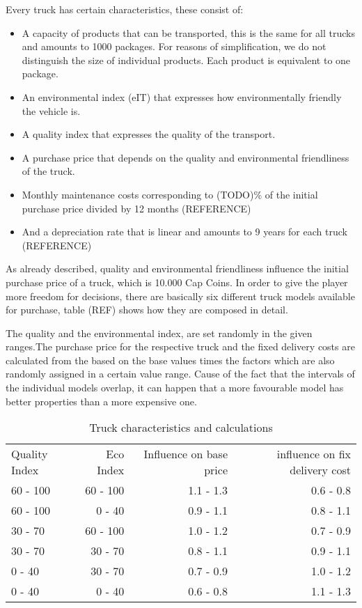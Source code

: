 Every truck has certain characteristics, these consist of:
\begin{itemize}
    \item A capacity of products that can be transported, this is the same for all trucks and amounts to 1000 packages. For reasons of simplification, we do not distinguish the size of individual products.  Each product is equivalent to one package. 
    \item An environmental index (eIT) that expresses how environmentally friendly the vehicle is.
    \item A quality index that expresses the quality of the transport.
    \item A purchase price that depends on the quality and environmental friendliness of the truck.
    \item Monthly maintenance costs corresponding to (TODO)\% of the initial purchase price divided by 12 months (REFERENCE)
    \item And a depreciation rate that is linear and amounts to 9 years for each truck (REFERENCE) 
\end{itemize}

As already described, quality and environmental friendliness influence the initial purchase price of a truck, which is 10.000 Cap Coins. In order to give the player more freedom for decisions, there are basically six different truck models available for purchase, table (REF) shows how they are composed in detail. 

The quality and the environmental index, are set randomly in the given ranges.The purchase price for the respective truck and the fixed delivery costs are calculated from the based on the base values times the factors which are also randomly assigned in a certain value range. Cause of the fact that the intervals of the individual models overlap, it can happen that a more favourable model has better properties than a more expensive one.


\begin{table}[ht]
    \centering
    \begin{tabular}{|l|r|r|r|}
    \hline
    Quality Index & Eco Index & Influence on base price & influence on fix delivery cost \\
    60 - 100      & 60 - 100   & 1.1 - 1.3   & 0.6 - 0.8       \\
    60 - 100      & 0 - 40     & 0.9 - 1.1   & 0.8 - 1.1       \\
    30 - 70       & 60 - 100   & 1.0 - 1.2   & 0.7 - 0.9       \\
    30 - 70       & 30 - 70    & 0.8 - 1.1   & 0.9 - 1.1       \\
    0 - 40        & 30 - 70    & 0.7 - 0.9   & 1.0 - 1.2       \\
    0 - 40        & 0 - 40     & 0.6 - 0.8   & 1.1 - 1.3       \\
    \hline
    \end{tabular}
    \caption{Truck characteristics and calculations}
    \label{Truck_characteristics}
\end{table}

